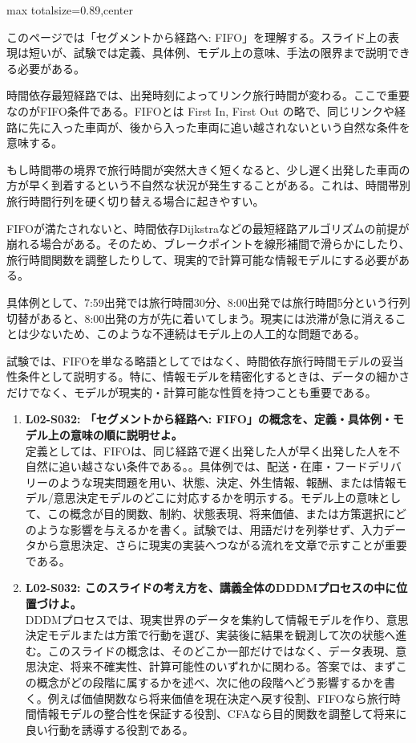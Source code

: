 \begin{minipage}[t]{0.58\textwidth}
\begin{adjustbox}{max totalsize={\textwidth}{0.89\textheight},center}
\begin{minipage}{\textwidth}\scriptsize
{}このページでは「セグメントから経路へ: FIFO」を理解する。スライド上の表現は短いが、試験では定義、具体例、モデル上の意味、手法の限界まで説明できる必要がある。\par
時間依存最短経路では、出発時刻によってリンク旅行時間が変わる。ここで重要なのがFIFO条件である。FIFOとは First In, First Out の略で、同じリンクや経路に先に入った車両が、後から入った車両に追い越されないという自然な条件を意味する。\par
もし時間帯の境界で旅行時間が突然大きく短くなると、少し遅く出発した車両の方が早く到着するという不自然な状況が発生することがある。これは、時間帯別旅行時間行列を硬く切り替える場合に起きやすい。\par
FIFOが満たされないと、時間依存Dijkstraなどの最短経路アルゴリズムの前提が崩れる場合がある。そのため、ブレークポイントを線形補間で滑らかにしたり、旅行時間関数を調整したりして、現実的で計算可能な情報モデルにする必要がある。\par
具体例として、7:59出発では旅行時間30分、8:00出発では旅行時間5分という行列切替があると、8:00出発の方が先に着いてしまう。現実には渋滞が急に消えることは少ないため、このような不連続はモデル上の人工的な問題である。\par
試験では、FIFOを単なる略語としてではなく、時間依存旅行時間モデルの妥当性条件として説明する。特に、情報モデルを精密化するときは、データの細かさだけでなく、モデルが現実的・計算可能な性質を持つことも重要である。\par{}\begin{enumerate}\item \textbf{L02-S032: 「セグメントから経路へ: FIFO」の概念を、定義・具体例・モデル上の意味の順に説明せよ。}\\定義としては、FIFOは、同じ経路で遅く出発した人が早く出発した人を不自然に追い越さない条件である。。具体例では、配送・在庫・フードデリバリーのような現実問題を用い、状態、決定、外生情報、報酬、または情報モデル/意思決定モデルのどこに対応するかを明示する。モデル上の意味として、この概念が目的関数、制約、状態表現、将来価値、または方策選択にどのような影響を与えるかを書く。試験では、用語だけを列挙せず、入力データから意思決定、さらに現実の実装へつながる流れを文章で示すことが重要である。\item \textbf{L02-S032: このスライドの考え方を、講義全体のDDDMプロセスの中に位置づけよ。}\\DDDMプロセスでは、現実世界のデータを集約して情報モデルを作り、意思決定モデルまたは方策で行動を選び、実装後に結果を観測して次の状態へ進む。このスライドの概念は、そのどこか一部だけではなく、データ表現、意思決定、将来不確実性、計算可能性のいずれかに関わる。答案では、まずこの概念がどの段階に属するかを述べ、次に他の段階へどう影響するかを書く。例えば価値関数なら将来価値を現在決定へ戻す役割、FIFOなら旅行時間情報モデルの整合性を保証する役割、CFAなら目的関数を調整して将来に良い行動を誘導する役割である。\end{enumerate}

\end{minipage}
\end{adjustbox}
\end{minipage}
